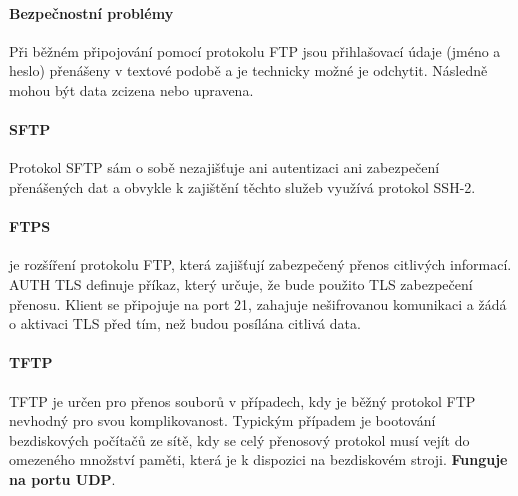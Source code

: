 \documentclass[10pt,a4paper]{article}
\begin{document}
\paragraph{Bezpečnostní problémy} Při běžném připojování pomocí protokolu FTP jsou přihlašovací údaje (jméno a heslo) přenášeny v textové podobě a je technicky možné je odchytit. Následně mohou být data zcizena nebo upravena.
\paragraph{SFTP} Protokol SFTP sám o sobě nezajišťuje ani autentizaci ani zabezpečení přenášených dat a obvykle k zajištění těchto služeb využívá protokol SSH-2.
\paragraph{FTPS} je rozšíření protokolu FTP, která zajišťují zabezpečený přenos citlivých informací. AUTH TLS definuje příkaz, který určuje, že bude použito TLS zabezpečení přenosu. Klient se připojuje na port 21, zahajuje nešifrovanou komunikaci a žádá o aktivaci TLS před tím, než budou posílána citlivá data.
\paragraph{TFTP} TFTP je určen pro přenos souborů v případech, kdy je běžný protokol FTP nevhodný pro svou komplikovanost. Typickým případem je bootování bezdiskových počítačů ze sítě, kdy se celý přenosový protokol musí vejít do omezeného množství paměti, která je k dispozici na bezdiskovém stroji. \textbf{Funguje na portu UDP}.
\end{document}
